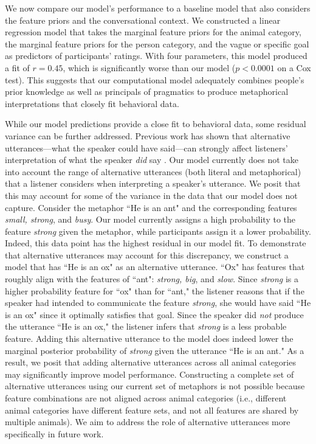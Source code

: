 \documentclass[10pt,letterpaper]{article}
\begin{document}
We now compare our model's performance to a baseline model that also considers the feature priors and the conversational context. We constructed a linear regression model that takes the marginal feature priors for the animal category, the marginal feature priors for the person category, and the vague or specific goal as predictors of participants' ratings. With four parameters, this model produced a fit of $r= 0.45$, which is significantly worse than our model ($p < 0.0001$ on a Cox test). This suggests that our computational model adequately combines people's prior knowledge as well as principals of pragmatics to produce metaphorical interpretations that closely fit behavioral data.

While our model predictions provide a close fit to behavioral data, some residual variance can be further addressed. Previous work has shown that alternative utterances---what the speaker could have said---can strongly affect listeners' interpretation of what the speaker \emph{did} say \cite{bergen2012s}. Our model currently does not take into account the range of alternative utterances (both literal and metaphorical) that a listener considers when interpreting a speaker's utterance. We posit that this may account for some of the variance in the data that our model does not capture. Consider the metaphor ``He is an ant" and the corresponding features \emph{small, strong}, and \emph{busy}. Our model currently assigns a high probability to the feature \emph{strong} given the metaphor, while participants assign it a lower probability. Indeed, this data point has the highest residual in our model fit. To demonstrate that alternative utterances may account for this discrepancy, we construct a model that has ``He is an ox" as an alternative utterance. ``Ox" has features that roughly align with the features of ``ant": \emph{strong, big}, and \emph{slow}. Since \emph{strong} is a higher probability feature for ``ox" than for ``ant," the listener reasons that if the speaker had intended to communicate the feature \emph{strong}, she would have said ``He is an ox" since it optimally satisfies that goal. Since the speaker did \emph{not} produce the utterance ``He is an ox," the listener infers that \emph{strong} is a less probable feature. Adding this alternative utterance to the model does indeed lower the marginal posterior probability of \emph{strong} given the utterance ``He is an ant." As a result, we posit that adding alternative utterances across all animal categories may significantly improve model performance. Constructing a complete set of alternative utterances using our current set of metaphors is not possible because feature combinations are not aligned across animal categories (i.e., different animal categories have different feature sets, and not all features are shared by multiple animals). We aim to address the role of alternative utterances more specifically in future work.
\end{document}
